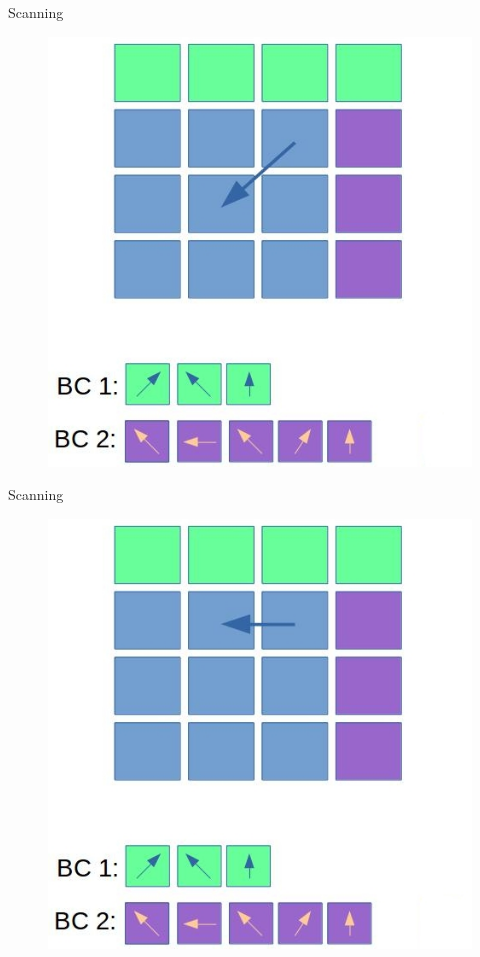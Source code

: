 \documentclass[9pt]{beamer}
\begin{document}
\begin{frame}[t]{Scanning}
\begin{figure}
\includegraphics[scale=0.3]{images/scan-1.jpg}
\centering
\end{figure}
\end{frame}

\begin{frame}[t]{Scanning}
\begin{figure}
\includegraphics[scale=0.3]{images/scan-2.jpg}
\centering
\end{figure}
\end{frame}
\end{document}
